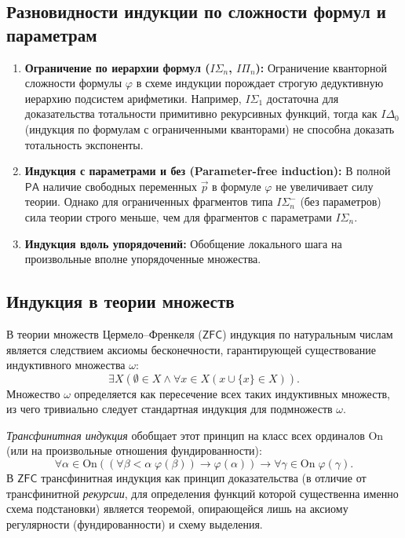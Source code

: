 \documentclass[12pt,a4paper]{article}
\theoremstyle{plain}
\theoremstyle{definition}
\newcommand{\ph}{\varphi}
\newcommand{\toinf}{\rightarrow}
\newcommand{\PA}{\textsf{PA}}
\newcommand{\ZFC}{\textsf{ZFC}}
\begin{document}
\subsection{Разновидности индукции по сложности формул и параметрам}
\begin{enumerate}[label=\arabic*.]
    \item \textbf{Ограничение по иерархии формул ($I\Sigma_n$, $I\Pi_n$):} Ограничение кванторной сложности формулы $\ph$ в схеме индукции порождает строгую дедуктивную иерархию подсистем арифметики. Например, $I\Sigma_1$ достаточна для доказательства тотальности примитивно рекурсивных функций, тогда как $I\Delta_0$ (индукция по формулам с ограниченными кванторами) не способна доказать тотальность экспоненты.
    \item \textbf{Индукция с параметрами и без (Parameter-free induction):} В полной $\PA$ наличие свободных переменных $\vec{p}$ в формуле $\ph$ не увеличивает силу теории. Однако для ограниченных фрагментов типа $I\Sigma_n^-$ (без параметров) сила теории строго меньше, чем для фрагментов с параметрами $I\Sigma_n$.
    \item \textbf{Индукция вдоль упорядочений:} Обобщение локального шага на произвольные вполне упорядоченные множества.
\end{enumerate}

\subsection{Индукция в теории множеств}
В теории множеств Цермело--Френкеля ($\ZFC$) индукция по натуральным числам является следствием аксиомы бесконечности, гарантирующей существование индуктивного множества $\omega$:
\begin{equation}
    \exists X \left( \emptyset \in X \land \forall x \in X (x \cup \{x\} \in X) \right).
\end{equation}
Множество $\omega$ определяется как пересечение всех таких индуктивных множеств, из чего тривиально следует стандартная индукция для подмножеств $\omega$.

\textit{Трансфинитная индукция} обобщает этот принцип на класс всех ординалов $\text{On}$ (или на произвольные отношения фундированности):
\begin{equation}
    \forall \alpha \in \text{On} \left( (\forall \beta < \alpha \; \ph(\beta)) \toinf \ph(\alpha) \right) \toinf \forall \gamma \in \text{On} \; \ph(\gamma).
\end{equation}
В $\ZFC$ трансфинитная индукция как принцип доказательства (в отличие от трансфинитной \emph{рекурсии}, для определения функций которой существенна именно схема подстановки) является теоремой, опирающейся лишь на аксиому регулярности (фундированности) и схему выделения.
\end{document}
